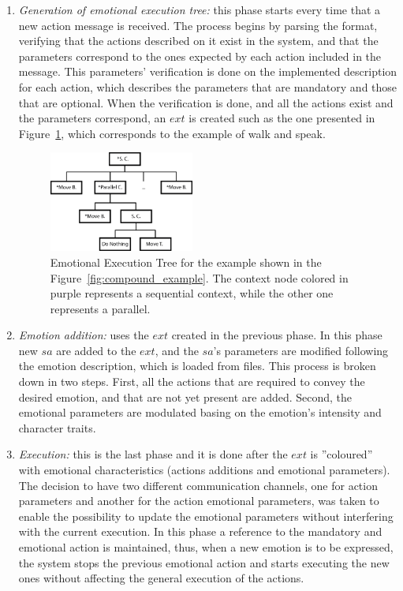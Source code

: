 \begin{enumerate}
	\item \textit{Generation of emotional execution tree:} this phase starts every time that a new action message is received. The process begins by parsing the format, verifying that the actions described on it exist in the system, and that the parameters correspond to the ones expected by each action included in the message. This parameters' verification is done on the implemented description for each action, which describes the parameters that are mandatory and those that are optional. %
When the verification is done, and all the actions exist and the parameters correspond, an $ext$ %
is created such as the one presented in Figure~\ref{fig:reference}, which corresponds to the example of walk and speak.
	\begin{figure}
		\centering
	\includegraphics[width=0.45\textwidth]{./Images/Representation.png}
	\caption{Emotional Execution Tree for the example shown in the Figure~\ref{fig:compound_example}. The context node colored in purple represents a sequential context, while the other one represents a parallel.} %
	\label{fig:reference}
	\end{figure}
	\item \textit{Emotion addition:} uses the $ext$ created in the previous phase. In this phase new $sa$ %
are added to the $ext$, and the $sa$'s parameters are modified following the emotion description, which is loaded from files. This process is broken down in two steps. First, all the actions that are required to convey the desired emotion, and that are not yet present are added. Second, the emotional parameters are modulated basing on the emotion's intensity and character traits.
	\item \textit{Execution:} this is the last phase and it is done after the $ext$ is ''coloured'' with emotional characteristics (actions additions and emotional parameters). The decision to have two different communication channels, one for action parameters and another for the action emotional parameters, was taken to enable the possibility to update the emotional parameters without interfering with the current execution. In this phase a reference to the mandatory %
and emotional action is maintained, thus, when a new emotion is to be expressed, the system stops the previous emotional action and starts executing the new ones without affecting the general execution of the actions.
\end{enumerate}
